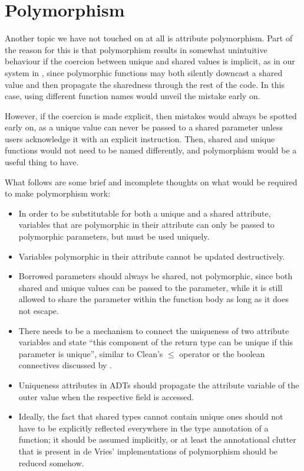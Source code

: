 \section{Polymorphism}
Another topic we have not touched on at all is attribute polymorphism. Part of the reason for this is that polymorphism results in somewhat unintuitive behaviour if the coercion between unique and shared values is implicit, as in our system in , since polymorphic functions may both silently downcast a shared value and then propagate the sharedness through the rest of the code. In this case, using different function names would unveil the mistake early on.

However, if the coercion is made explicit, then mistakes would always be spotted early on, as a unique value can never be passed to a shared parameter unless users acknowledge it with an explicit instruction. Then, shared and unique functions would not need to be named differently, and polymorphism would be a useful thing to have.

What follows are some brief and incomplete thoughts on what would be required to make polymorphism work:
\begin{itemize}
	\item In order to be substitutable for both a unique and a shared attribute, variables that are polymorphic in their attribute can only be passed to polymorphic parameters, but must be used uniquely.
	\item Variables polymorphic in their attribute cannot be updated destructively.
	\item Borrowed parameters should always be shared, not polymorphic, since both shared and unique values can be passed to the parameter, while it is still allowed to share the parameter within the function body as long as it does not escape.
	\item There needs to be a mechanism to connect the uniqueness of two attribute variables and state ``this component of the return type can be unique if this parameter is unique'', similar to Clean's $\leq$ operator or the boolean connectives discussed by \cite{de_vries_making_2009}.
	\item Uniqueness attributes in ADTs should propagate the attribute variable of the outer value when the respective field is accessed.
	\item Ideally, the fact that shared types cannot contain unique ones should not have to be explicitly reflected everywhere in the type annotation of a function; it should be assumed implicitly, or at least the annotational clutter that is present in de Vries' implementations of polymorphism should be reduced somehow.
\end{itemize}

